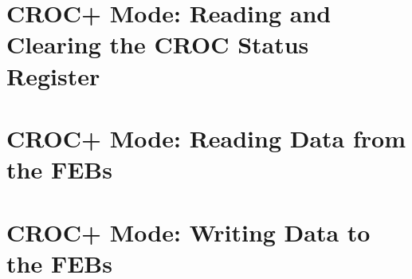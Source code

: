 \section{CROC+ Mode: Reading and Clearing the CROC Status Register}
\label{sec:readandclearcrocstatus}



\section{CROC+ Mode: Reading Data from the FEBs}
\label{sec:readfromfebs}


\section{CROC+ Mode: Writing Data to the FEBs}
\label{sec:writetofebs}






